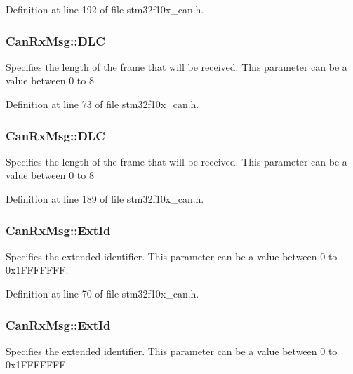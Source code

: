 Definition at line 192 of file stm32f10x\+\_\+can.\+h.

\subsubsection[{\texorpdfstring{D\+LC}{DLC}}]{ Can\+Rx\+Msg\+::\+D\+LC}\hypertarget{struct_can_rx_msg_acd3c944910b56789d759a05d85660773}{}\label{struct_can_rx_msg_acd3c944910b56789d759a05d85660773}
Specifies the length of the frame that will be received. This parameter can be a value between 0 to 8 

Definition at line 73 of file stm32f10x\+\_\+can.\+h.

\subsubsection[{\texorpdfstring{D\+LC}{DLC}}]{ Can\+Rx\+Msg\+::\+D\+LC}\hypertarget{struct_can_rx_msg_abf77d3abf9ad290c08cdfd5d99ebc745}{}\label{struct_can_rx_msg_abf77d3abf9ad290c08cdfd5d99ebc745}
Specifies the length of the frame that will be received. This parameter can be a value between 0 to 8 

Definition at line 189 of file stm32f10x\+\_\+can.\+h.

\subsubsection[{\texorpdfstring{Ext\+Id}{ExtId}}]{ Can\+Rx\+Msg\+::\+Ext\+Id}\hypertarget{struct_can_rx_msg_a17367a63ec9c4645a24e83ef95645743}{}\label{struct_can_rx_msg_a17367a63ec9c4645a24e83ef95645743}
Specifies the extended identifier. This parameter can be a value between 0 to 0x1\+F\+F\+F\+F\+F\+FF. 

Definition at line 70 of file stm32f10x\+\_\+can.\+h.

\subsubsection[{\texorpdfstring{Ext\+Id}{ExtId}}]{ Can\+Rx\+Msg\+::\+Ext\+Id}\hypertarget{struct_can_rx_msg_a1fdca10d31c81eea2ccef41d2aced562}{}\label{struct_can_rx_msg_a1fdca10d31c81eea2ccef41d2aced562}
Specifies the extended identifier. This parameter can be a value between 0 to 0x1\+F\+F\+F\+F\+F\+FF. 

